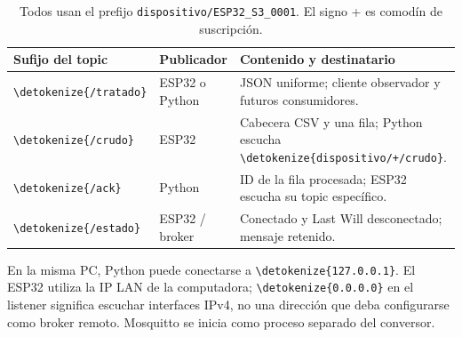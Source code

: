 \documentclass[11pt,a4paper]{article}
\newcommand{\code}[1]{\expandafter\nolinkurl\expandafter{\detokenize{#1}}}
\begin{document}
\begin{table}[h!]
\small
\begin{tabularx}{\linewidth}{@{}P{28mm}P{43mm}Y@{}}
\toprule
\textbf{Sufijo del topic} & \textbf{Publicador} & \textbf{Contenido y destinatario}\\\midrule
\code{/tratado} & ESP32 o Python & JSON uniforme; cliente observador y futuros consumidores.\\
\code{/crudo} & ESP32 & Cabecera CSV y una fila; Python escucha \code{dispositivo/+/crudo}.\\
\code{/ack} & Python & ID de la fila procesada; ESP32 escucha su topic específico.\\
\code{/estado} & ESP32 / broker & Conectado y Last Will desconectado; mensaje retenido.\\
\bottomrule
\end{tabularx}
\caption{Todos usan el prefijo \texttt{dispositivo/ESP32\_S3\_0001}. El signo + es comodín de suscripción.}
\end{table}

En la misma PC, Python puede conectarse a \code{127.0.0.1}. El ESP32 utiliza la IP LAN de la computadora; \code{0.0.0.0} en el listener significa escuchar interfaces IPv4, no una dirección que deba configurarse como broker remoto. Mosquitto se inicia como proceso separado del conversor.\cite{mosquitto}
\end{document}
